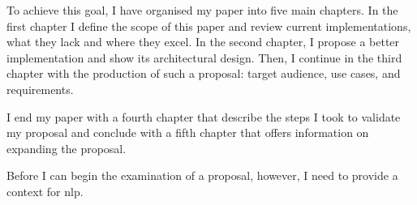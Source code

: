 To achieve this goal, I have organised my paper into five main chapters.
In the first chapter I define the scope of this paper and review
current implementations, what they lack and where they excel. In the
second chapter, I propose a better implementation and show
its architectural design. Then, I continue in the third chapter with the
production of such a proposal: target audience, use cases, and requirements.

I end my paper with a fourth chapter that describe the steps I took to
validate my proposal and conclude with a fifth chapter that offers
information on expanding the proposal.

Before I can begin the examination of a proposal, however, I need to
provide a context for \gls{nlp}.

\endgroup

